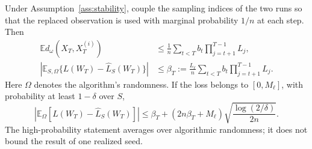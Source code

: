\begin{theorem}
\label{thm:generalization}
Under Assumption~\ref{ass:stability}, couple the sampling indices of the
two runs so that the replaced observation is used with marginal probability
$1/n$ at each step. Then
\begin{align}
 \mathbb E d_\omega(X_T,X_T^{(i)})
 &\le\frac1n\sum_{t<T}b_t\prod_{j=t+1}^{T-1}L_j,\label{eq:stability-product}\\
 \left|\mathbb E_{S,\Omega}\{L(W_T)-\widehat L_S(W_T)\}\right|
 &\le\beta_T:=\frac{L_\ell}{n}
                    \sum_{t<T}b_t\prod_{j=t+1}^{T-1}L_j.
 \label{eq:expected-generalization}
\end{align}
Here $\Omega$ denotes the algorithm's randomness. If the loss belongs to
$[0,M_\ell]$, with probability at least $1-\delta$ over $S$,
\begin{equation}
 \left|\mathbb E_\Omega[L(W_T)-\widehat L_S(W_T)]\right|
 \le\beta_T+(2n\beta_T+M_\ell)
                    \sqrt{\frac{\log(2/\delta)}{2n}}.
 \label{eq:stability-highprob}
\end{equation}
The high-probability statement averages over algorithmic randomness;
it does not bound the result of one realized seed.
\end{theorem}

